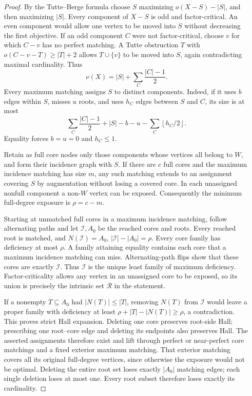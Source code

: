 \documentclass[11pt,a4paper]{article}
\newcommand{\floor}[1]{\left\lfloor#1\right\rfloor}
\theoremstyle{definition}
\begin{document}
\begin{proof}
By the Tutte--Berge formula choose $S$ maximizing $o(X-S)-|S|$, and then maximizing $|S|$. Every component of $X-S$ is odd and factor-critical. An even component would allow one vertex to be moved into $S$ without decreasing the first objective. If an odd component $C$ were not factor-critical, choose $v$ for which $C-v$ has no perfect matching. A Tutte obstruction $T$ with $o(C-v-T)\ge |T|+2$ allows $T\cup\{v\}$ to be moved into $S$, again contradicting maximal cardinality. Thus
\[
 \nu(X)=|S|+\sum_C\frac{|C|-1}{2}.
\]
Every maximum matching assigns $S$ to distinct components. Indeed, if it uses $b$ edges within $S$, misses $u$ roots, and uses $h_C$ edges between $S$ and $C$, its size is at most
\[
 \sum_C\frac{|C|-1}{2}+|S|-b-u-\sum_C\floor{h_C/2}.
\]
Equality forces $b=u=0$ and $h_C\le1$.

Retain as full core nodes only those components whose vertices all belong to $W$, and form their incidence graph with $S$. If there are $c$ full cores and the maximum incidence matching has size $m$, any such matching extends to an assignment covering $S$ by augmentation without losing a covered core. In each unassigned nonfull component a non-$W$ vertex can be exposed. Consequently the minimum full-degree exposure is $\rho=c-m$.

Starting at unmatched full cores in a maximum incidence matching, follow alternating paths and let $\mathcal I,A_0$ be the reached cores and roots. Every reached root is matched, and
$N(\mathcal I)=A_0$, $|\mathcal I|-|A_0|=\rho$. Every core family has deficiency at most $\rho$. A family attaining equality contains each core that a maximum incidence matching can miss. Alternating-path flips show that these cores are exactly $\mathcal I$. Thus $\mathcal I$ is the unique least family of maximum deficiency. Factor-criticality allows any vertex in an unassigned core to be exposed, so its union is precisely the intrinsic set $\mathcal R$ in the statement.

If a nonempty $T\subseteq A_0$ had $|N(T)|\le|T|$, removing $N(T)$ from $\mathcal I$ would leave a proper family with deficiency at least $\rho+|T|-|N(T)|\ge\rho$, a contradiction. This proves strict Hall expansion. Deleting one core preserves root-side Hall; prescribing one root--core edge and deleting its endpoints also preserves Hall. The asserted assignments therefore exist and lift through perfect or near-perfect core matchings and a fixed exterior maximum matching. That exterior matching covers all its original full-degree vertices, since otherwise the exposure would not be optimal. Deleting the entire root set loses exactly $|A_0|$ matching edges; each single deletion loses at most one. Every root subset therefore loses exactly its cardinality.
\end{proof}
\end{document}
